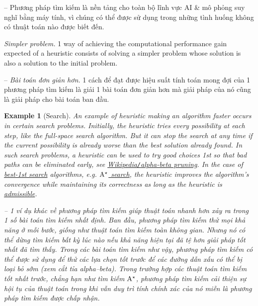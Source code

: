 \documentclass{article}
\newtheorem{example}{Example}
\begin{document}
-- Phương pháp tìm kiếm là nền tảng cho toàn bộ lĩnh vực AI \& mô phỏng suy nghĩ bằng máy tính, vì chúng có thể được sử dụng trong những tình huống không có thuật toán nào được biết đến.

{\it Simpler problem.} 1 way of achieving the computational performance gain expected of a heuristic consists of solving a simpler problem whose solution is also a solution to the initial problem.

-- {\it Bài toán đơn giản hơn.} 1 cách để đạt được hiệu suất tính toán mong đợi của 1 phương pháp tìm kiếm là giải 1 bài toán đơn giản hơn mà giải pháp của nó cũng là giải pháp cho bài toán ban đầu.

\begin{example}[Search]
	An example of heuristic making an algorithm faster occurs in certain search problems. Initially, the heuristic tries every possibility at each step, like the full-space search algorithm. But it can stop the search at any time if the current possibility is already worse than the best solution already found. In such search problems, a heuristic can be used to try good choices 1st so that bad paths can be eliminated early, see \href{https://en.wikipedia.org/wiki/Alpha%E2%80%93beta_pruning}{Wikipedia{\tt/}alpha-beta pruning}. In the case of \href{https://en.wikipedia.org/wiki/Best-first_search}{best-1st search} algorithms, e.g. \href{https://en.wikipedia.org/wiki/A*_search}{$\rm A^\star$ search}, the heuristic improves the algorithm's convergence while maintaining its correctness as long as the heuristic is \href{https://en.wikipedia.org/wiki/Admissible_heuristic}{admissible}.
	
	-- 1 ví dụ khác về phương pháp tìm kiếm giúp thuật toán nhanh hơn xảy ra trong 1 số bài toán tìm kiếm nhất định. Ban đầu, phương pháp tìm kiếm thử mọi khả năng ở mỗi bước, giống như thuật toán tìm kiếm toàn không gian. Nhưng nó có thể dừng tìm kiếm bất kỳ lúc nào nếu khả năng hiện tại đã tệ hơn giải pháp tốt nhất đã tìm thấy. Trong các bài toán tìm kiếm như vậy, phương pháp tìm kiếm có thể được sử dụng để thử các lựa chọn tốt trước để các đường dẫn xấu có thể bị loại bỏ sớm (xem cắt tỉa alpha–beta). Trong trường hợp các thuật toán tìm kiếm tốt nhất trước, chẳng hạn như tìm kiếm $\rm A^\star$, phương pháp tìm kiếm cải thiện sự hội tụ của thuật toán trong khi vẫn duy trì tính chính xác của nó miễn là phương pháp tìm kiếm được chấp nhận.
\end{example}
\end{document}
